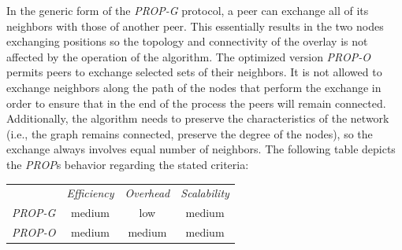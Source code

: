 In the generic form of the \emph{PROP-G} protocol, a peer can exchange all of
its neighbors with those of another peer. This essentially results in the two
nodes exchanging positions so the topology and connectivity of the overlay is
not affected by the operation of the algorithm. The optimized version
\emph{PROP-O} permits peers to exchange selected sets of their neighbors. It is
not allowed to exchange neighbors along the path of the nodes that perform the
exchange in order to ensure that in the end of the process the peers will remain
connected. Additionally, the algorithm needs to preserve the characteristics of
the network (i.e., the graph remains connected, preserve the degree of the
nodes), so the exchange always involves equal number of neighbors.
The following table depicts the \emph{PROP}s behavior 
regarding the stated criteria:
\begin{center}
{\footnotesize
\begin{tabular}{rccc}
\multicolumn{1}{r}{} &
\multicolumn{1}{c}{\emph{Efficiency}} &
\multicolumn{1}{c}{\emph{Overhead}} &
\multicolumn{1}{c}{\emph{Scalability}}
\\
\cline{2-4}
\emph{PROP-G} &
medium &
low &
medium \\
\emph{PROP-O} &
medium &
medium &
medium \\
\end{tabular}
}
\end{center}



